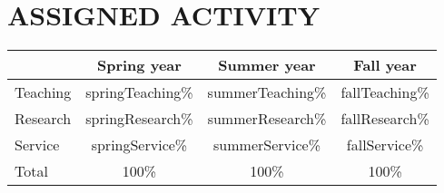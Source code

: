 \section{ASSIGNED ACTIVITY}
\begin{center}
\begin{tabular}{lccc}


& Spring {{year}} & Summer {{year}} & Fall {{year}} 
 
\\
\hline
Teaching 
& {{springTeaching}}\%  & {{summerTeaching}}\% & {{fallTeaching}}\%

\\
Research 
& {{springResearch}}\% & {{summerResearch}}\% & {{fallResearch}}\%

\\
Service
& {{springService}}\% & {{summerService}}\% & {{fallService}}\%   

\\
\hline
Total & 100\% & 100\% & 100\%

\end{tabular}
\end{center}